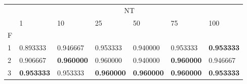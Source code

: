 \begin{table}[htbp]
\centering
\label{iris-results}
\begin{tabular}{lllllll}
\toprule
 & \multicolumn{6}{c}{NT} \\
 & 1 & 10 & 25 & 50 & 75 & 100 \\
F &  &  &  &  &  &  \\
\midrule
1 & 0.893333 & 0.946667 & 0.953333 & 0.940000 & 0.953333 & \textbf{0.953333} \\
2 & 0.906667 & \textbf{0.960000} & 0.960000 & 0.940000 & \textbf{0.960000} & 0.946667 \\
3 & \textbf{0.953333} & 0.953333 & \textbf{0.960000} & \textbf{0.960000} & \textbf{0.960000} & \textbf{0.953333} \\
\bottomrule
\end{tabular}
\end{table}
